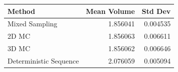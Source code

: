 \begin{tabular}{lrr}
\toprule
Method & Mean Volume & Std Dev \\
\midrule
Mixed Sampling & 1.856041 & 0.004535 \\
2D MC & 1.856063 & 0.006611 \\
3D MC & 1.856062 & 0.006646 \\
Deterministic Sequence & 2.076059 & 0.005094 \\
\bottomrule
\end{tabular}

